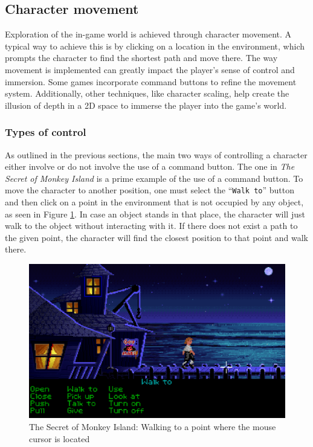 \subsection{Character movement}
\label{sec:Character movement}
Exploration of the in-game world is achieved through character movement. A typical way to achieve this is by clicking on a location in the environment, which prompts the character to find the shortest path and move there. The way movement is implemented can greatly impact the player's sense of control and immersion. Some games incorporate command buttons to refine the movement system. Additionally, other techniques, like character scaling, help create the illusion of depth in a 2D space to immerse the player into the game's world.

\subsubsection{Types of control}
As outlined in the previous sections, the main two ways of controlling a character either involve or do not involve the use of a command button. The one in \textit{The Secret of Monkey Island} is a prime example of the use of a command button. To move the character to another position, one must select the “\texttt{Walk to}” button and then click on a point in the environment that is not occupied by any object, as seen in Figure \ref{fig:M-TSoMI-W}. In case an object stands in that place, the character will just walk to the object without interacting with it. If there does not exist a path to the given point, the character will find the closest position to that point and walk there.

\begin{figure}[H]
\centering
\includegraphics[width=.8\linewidth]{img/W-TSoMI.png}
\caption{The Secret of Monkey Island: Walking to a point where the mouse cursor is located}
\label{fig:M-TSoMI-W}
\end{figure}

